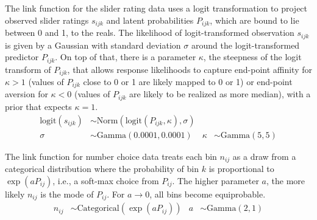 \documentclass[10pt,letterpaper]{article}
\DeclareMathOperator{\expo}{exp}
\begin{document}
The link function for the slider rating data uses a logit transformation to project observed
slider ratings $s_{ijk}$ and latent probabilities $P_{ijk}$, which are bound to lie between 0
and 1, to the reals. The likelihood of logit-transformed observation $s_{ijk}$ is given by a
Gaussian with standard deviation $\sigma$ around the logit-transformed predictor $P_{ijk}$. On
top of that, there is a parameter $\kappa$, the steepness of the logit transform of $P_{ijk}$,
that allows response likelihoods to capture end-point affinity for $\kappa >1$ (values of
$P_{ijk}$ close to 0 or 1 are likely mapped to 0 or 1) or end-point aversion for $\kappa <0$
(values of $P_{ijk}$ are likely to be realized as more median), with a prior that expects
$\kappa=1$.
\begin{align*}
  \text{logit}(s_{ijk}) &\sim
        \text{Norm}(\text{logit}(P_{ijk}, \kappa), \sigma) \\
        \sigma &  \sim \text{Gamma}(0.0001,0.0001) & \kappa &\sim \text{Gamma}(5,5)
\end{align*}
 
The link function for number choice data treats each bin $n_{ij}$ as a draw from a categorical
distribution where the probability of bin $k$ is proportional to $\expo(a P_{ij})$, i.e., a
soft-max choice from $P_{ij}$. The higher parameter $a$, the more likely $n_{ij}$ is the mode
of $P_{ij}$. For $a \rightarrow 0$, all bins become equiprobable.
\begin{align*}
  n_{ij} & \sim
        \text{Categorical}(\expo(a P_{ij})) &
 a & \sim \text{Gamma}(2,1)
\end{align*}
\end{document}

